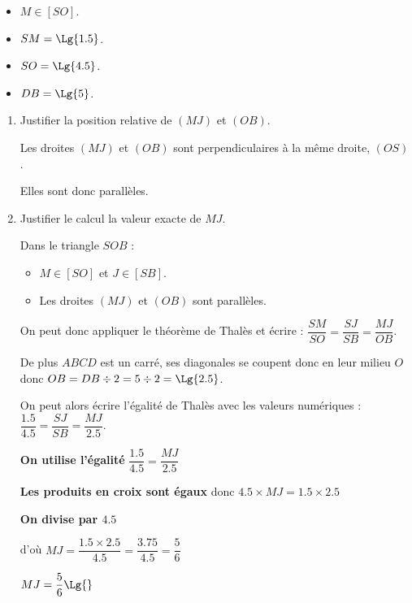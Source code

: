 \begin{corrige}
\begin{minipage}{0.5\linewidth}
{    
        }
    \end{minipage}
    \begin{minipage}{0.45\linewidth}
        \begin{itemize}
            \item $M \in [SO]$.
            \item $SM=\Lg{1.5}$.
            \item $SO=\Lg{4.5}$.
            \item $DB=\Lg{5}$.
        \end{itemize}
    \end{minipage}

    \begin{enumerate}
        \item Justifier la position relative de $(MJ)$ et $(OB)$.
        
        {\color{red} Les droites $(MJ)$ et $(OB)$ sont perpendiculaires à la même droite, $(OS)$.

        Elles sont donc parallèles.        
        }
        \item Justifier le calcul la valeur exacte de $MJ$.
        
        {\color{red} Dans le triangle $SOB$ :
        \begin{itemize}
            \item $M \in [SO]$ et $J \in [SB]$.
            \item Les droites $(MJ)$ et $(OB)$ sont parallèles.
        \end{itemize}        
        On peut donc appliquer le théorème de Thalès et écrire : $\dfrac{SM}{SO}=\dfrac{SJ}{SB}=\dfrac{MJ}{OB}$.

        \smallskip
        De plus $ABCD$ est un carré, ses diagonales se coupent donc en leur milieu $O$ donc $OB=DB\div 2 = 5\div 2 = \Lg{2.5}$.

        On peut alors écrire l'égalité de Thalès avec les valeurs numériques : $\dfrac{\num{1.5}}{\num{4.5}}=\dfrac{SJ}{SB}=\dfrac{MJ}{\num{2.5}}$.

        \textbf{On utilise l'égalité} $\dfrac{\num{1.5}}{\num{4.5}}=\dfrac{MJ}{\num{2.5}}$ 

        \textbf{Les produits en croix sont égaux} donc $\num{4.5}\times MJ=\num{1.5}\times \num{2.5}$
        
        \textbf{On divise par $\num{4.5}$}

        \smallskip
        d'où $MJ=\dfrac{\num{1.5}\times \num{2.5}}{\num{4.5}}=\dfrac{\num{3.75}}{\num{4.5}}=\dfrac{5}{6}$ 

        $MJ=\dfrac{5}{6} \Lg{}$
        }
    \end{enumerate}
\end{corrige}

